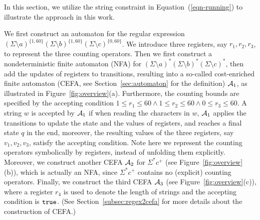 

In this section, we utilize the string constraint in Equation~(\ref{eqn-running}) to illustrate the approach in this work.


We first construct an automaton for the regular expression $(\Sigma \setminus a)^{\{1, 60\}} (\Sigma \setminus b)^{\{1, 60\}} (\Sigma \setminus c)^{\{0, 60\}}$. We introduce three registers, say $r_1, r_2, r_3$, to represent the three counting operators.  
Then we first construct a nondeterministic finite automaton (NFA) for $(\Sigma \setminus a)^* (\Sigma \setminus b)^* (\Sigma \setminus c)^*$, then add the updates of registers to transitions, resulting into a so-called cost-enriched finite automaton (CEFA, see Section~\ref{sec:automaton} for the definition) $\mathcal{A}_1$,  as illustrated in Figure~\ref{fig:overview}(a). 
Furthermore, the counting bounds are specified by the accepting condition $1 \le r_1 \le 60 \wedge 1 \le r_2 \le 60 \wedge 0 \le r_3 \le 60$. 
A string $w$ is accepted by $\mathcal{A}_1$ if\denghang{,} when reading the characters in $w$, $\mathcal{A}_1$ applies the transitions to update the state and the values of registers, and reaches a final state $q$ in the end, moreover, the resulting values of the three registers, say $v_1, v_2, v_3$, satisfy the accepting condition. 
Note here we represent the counting operators symbolically by registers, instead of unfolding them explicitly. 
Moreover, we construct another CEFA $\mathcal{A}_2$ for $\Sigma^* c^+$ (see Figure~\ref{fig:overview}(b)), which is actually an NFA, since $\Sigma^* c^+$ contains no (explicit) counting operators. Finally, we construct the third CEFA $\mathcal{A}_3$ (see Figure~\ref{fig:overview}(c)), where a register $r_4$ is used to denote the length of strings and the accepting condition is $\mathtt{true}$. (See Section~\ref{subsec:regex2cefa} for more details about the construction of CEFA.)


